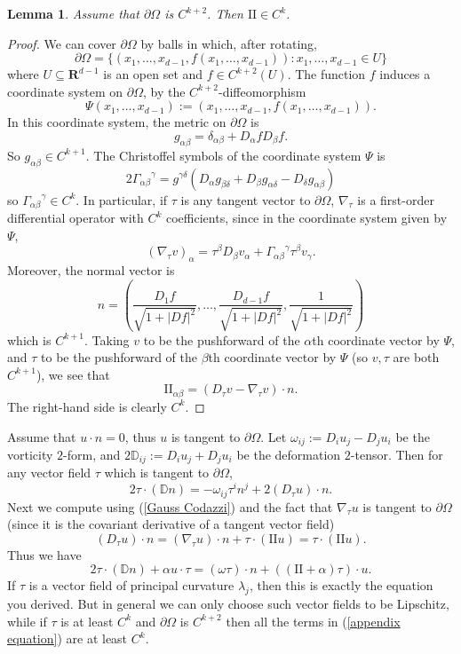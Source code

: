 \documentclass[reqno,11pt]{amsart}
\newcommand{\RR}{\mathbf{R}}
\newcommand{\Two}{\mathrm{I\!I}}
\newtheorem{lemma}[theorem]{Lemma}
\theoremstyle{definition}
\begin{document}
\begin{lemma}
Assume that $\partial \Omega$ is $C^{k + 2}$.
Then $\Two \in C^k$.
\end{lemma}
\begin{proof}
We can cover $\partial \Omega$ by balls in which, after rotating,
$$\partial \Omega = \{(x_1, \dots, x_{d - 1}, f(x_1, \dots, x_{d - 1})): x_1, \dots, x_{d - 1} \in U\}$$
where $U \subseteq \RR^{d - 1}$ is an open set and $f \in C^{k + 2}(U)$.
The function $f$ induces a coordinate system on $\partial \Omega$, by the $C^{k + 2}$-diffeomorphism 
$$\Psi(x_1, \dots, x_{d - 1}) := (x_1, \dots, x_{d - 1}, f(x_1, \dots, x_{d - 1})).$$
In this coordinate system, the metric on $\partial \Omega$ is 
$$g_{\alpha \beta} = \delta_{\alpha \beta} + D_\alpha f D_\beta f.$$
So $g_{\alpha \beta} \in C^{k + 1}$.
The Christoffel symbols of the coordinate system $\Psi$ is
$$2{\Gamma_{\alpha \beta}}^\gamma = g^{\gamma \delta} (D_\alpha g_{\beta \delta} + D_\beta g_{\alpha \delta} - D_\delta g_{\alpha \beta})$$
so ${\Gamma_{\alpha \beta}}^\gamma \in C^k$.
In particular, if $\tau$ is any tangent vector to $\partial \Omega$, $\nabla_\tau$ is a first-order differential operator with $C^k$ coefficients, since in the coordinate system given by $\Psi$,
$$(\nabla_\tau v)_\alpha = \tau^\beta D_\beta v_\alpha + {\Gamma_{\alpha \beta}}^\gamma \tau^\beta v_\gamma.$$
Moreover, the normal vector is 
$$n = \left(\frac{D_1 f}{\sqrt{1 + |Df|^2}}, \dots, \frac{D_{d - 1} f}{\sqrt{1 + |Df|^2}}, \frac{1}{\sqrt{1 + |Df|^2}}\right)$$
which is $C^{k + 1}$.
Taking $v$ to be the pushforward of the $\alpha$th coordinate vector by $\Psi$, and $\tau$ to be the pushforward of the $\beta$th coordinate vector by $\Psi$ (so $v, \tau$ are both $C^{k + 1}$), we see that
$$\Two_{\alpha \beta} = (D_\tau v - \nabla_\tau v) \cdot n.$$
The right-hand side is clearly $C^k$.
\end{proof}

Assume that $u \cdot n = 0$, thus $u$ is tangent to $\partial \Omega$.
Let $\omega_{ij} := D_i u_j - D_j u_i$ be the vorticity $2$-form, and $2\mathbb D_{ij} := D_i u_j + D_j u_i$ be the deformation $2$-tensor.
Then for any vector field $\tau$ which is tangent to $\partial \Omega$,
$$2\tau \cdot (\mathbb Dn) = -\omega_{ij} \tau^i n^j + 2(D_\tau u) \cdot n.$$
Next we compute using (\ref{Gauss Codazzi}) and the fact that $\nabla_\tau u$ is tangent to $\partial \Omega$ (since it is the covariant derivative of a tangent vector field)
$$(D_\tau u) \cdot n = (\nabla_\tau u) \cdot n + \tau \cdot (\Two u) = \tau \cdot (\Two u).$$
Thus we have 
\begin{equation}\label{appendix equation}
2\tau \cdot (\mathbb Dn) + \alpha u \cdot \tau = (\omega \tau) \cdot n + ((\Two + \alpha)\tau) \cdot u.
\end{equation}
If $\tau$ is a vector field of principal curvature $\lambda_j$, then this is exactly the equation you derived.
But in general we can only choose such vector fields to be Lipschitz, while if $\tau$ is at least $C^k$ and $\partial \Omega$ is $C^{k + 2}$ then all the terms in (\ref{appendix equation}) are at least $C^k$.


\printbibliography
\end{document}
